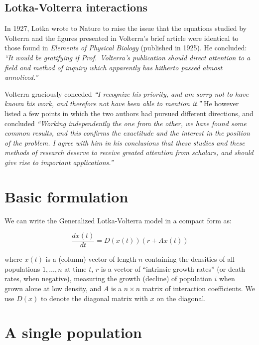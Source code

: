 \documentclass[
]{book}
\begin{document}
\hypertarget{lotka-volterra-interactions}{%
\subsection{Lotka-Volterra interactions}\label{lotka-volterra-interactions}}

In 1927, Lotka wrote to Nature to raise the issue that the equations studied by Volterra and the figures presented in Volterra's brief article were identical to those found in \emph{Elements of Physical Biology} (published in 1925). He concluded: \emph{``It would be gratifying if Prof.~Volterra's publication should direct attention to a field and method of inquiry which apparently has hitherto passed almost unnoticed.''}

Volterra graciously conceded \emph{``I recognize his priority, and am sorry not to have known his work, and therefore not have been able to mention it.''} He however listed a few points in which the two authors had pursued different directions, and concluded \emph{``Working independently the one from the other, we have found some common results, and this confirms the exactitude and the interest in the position of the problem. I agree with him in his conclusions that these studies and these methods of research deserve to receive greated attention from scholars, and should give rise to important applications.''}

\hypertarget{basic-formulation}{%
\section{Basic formulation}\label{basic-formulation}}

We can write the Generalized Lotka-Volterra model in a compact form as:

\[
\dfrac{dx(t)}{dt} = D(x(t))(r + A x(t))
\]

where \(x(t)\) is a (column) vector of length \(n\) containing the densities of all populations \(1, \ldots, n\) at time \(t\), \(r\) is a vector of ``intrinsic growth rates'' (or death rates, when negative), measuring the growth (decline) of population \(i\) when grown alone at low density, and \(A\) is a \(n \times n\) matrix of interaction coefficients. We use \(D(x)\) to denote the diagonal matrix with \(x\) on the diagonal.

\hypertarget{a-single-population}{%
\section{A single population}\label{a-single-population}}
\end{document}
